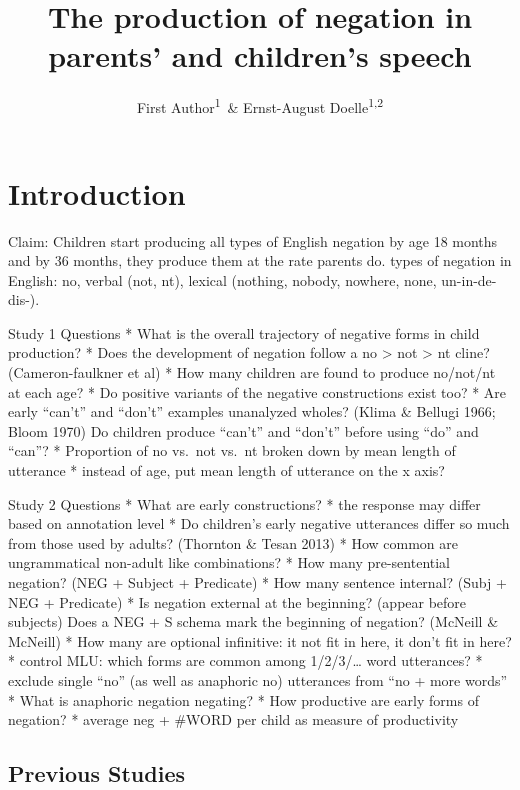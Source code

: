 \documentclass[man]{apa6}
\title{The production of negation in parents' and children's speech}
\author{First Author\textsuperscript{1}~\& Ernst-August
Doelle\textsuperscript{1,2}}
\date{}
\affiliation{
\vspace{0.5cm}
\textsuperscript{1} Wilhelm-Wundt-University\\\textsuperscript{2} Konstanz Business School}
\begin{document}
\maketitle

\section{Introduction}\label{introduction}

Claim: Children start producing all types of English negation by age 18
months and by 36 months, they produce them at the rate parents do. types
of negation in English: no, verbal (not, nt), lexical (nothing, nobody,
nowhere, none, un-in-de-dis-).

Study 1 Questions * What is the overall trajectory of negative forms in
child production? * Does the development of negation follow a no
\textgreater{} not \textgreater{} nt cline? (Cameron-faulkner et al) *
How many children are found to produce no/not/nt at each age? * Do
positive variants of the negative constructions exist too? * Are early
\enquote{can't} and \enquote{don't} examples unanalyzed wholes? (Klima
\& Bellugi 1966; Bloom 1970) Do children produce \enquote{can't} and
\enquote{don't} before using \enquote{do} and \enquote{can}? *
Proportion of no vs.~not vs.~nt broken down by mean length of utterance
* instead of age, put mean length of utterance on the x axis?

Study 2 Questions * What are early constructions? * the response may
differ based on annotation level * Do children's early negative
utterances differ so much from those used by adults? (Thornton \& Tesan
2013) * How common are ungrammatical non-adult like combinations? * How
many pre-sentential negation? (NEG + Subject + Predicate) * How many
sentence internal? (Subj + NEG + Predicate) * Is negation external at
the beginning? (appear before subjects) Does a NEG + S schema mark the
beginning of negation? (McNeill \& McNeill) * How many are optional
infinitive: it not fit in here, it don't fit in here? * control MLU:
which forms are common among 1/2/3/\ldots{} word utterances? * exclude
single \enquote{no} (as well as anaphoric no) utterances from
\enquote{no + more words} * What is anaphoric negation negating? * How
productive are early forms of negation? * average neg + \#WORD per child
as measure of productivity

\subsection{Previous Studies}\label{previous-studies}
\end{document}
